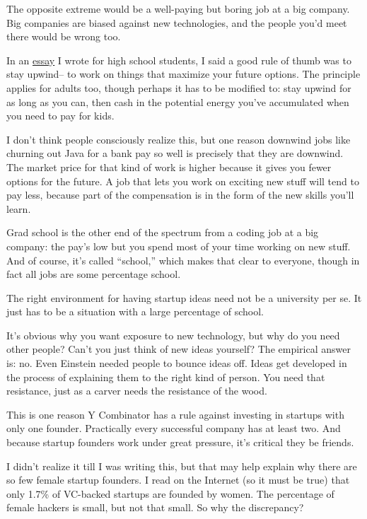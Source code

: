 The opposite extreme would be a well-paying but boring job at a big
company. Big companies are biased against new technologies, and the
people you'd meet there would be wrong too.

In an \href{hs.html}{essay} I wrote for high school students, I said a
good rule of thumb was to stay upwind-- to work on things that maximize
your future options. The principle applies for adults too, though
perhaps it has to be modified to: stay upwind for as long as you can,
then cash in the potential energy you've accumulated when you need to
pay for kids.

I don't think people consciously realize this, but one reason downwind
jobs like churning out Java for a bank pay so well is precisely that
they are downwind. The market price for that kind of work is higher
because it gives you fewer options for the future. A job that lets you
work on exciting new stuff will tend to pay less, because part of the
compensation is in the form of the new skills you'll learn.

Grad school is the other end of the spectrum from a coding job at a big
company: the pay's low but you spend most of your time working on new
stuff. And of course, it's called ``school,'' which makes that clear to
everyone, though in fact all jobs are some percentage school.

The right environment for having startup ideas need not be a university
per se. It just has to be a situation with a large percentage of school.

It's obvious why you want exposure to new technology, but why do you
need other people? Can't you just think of new ideas yourself? The
empirical answer is: no. Even Einstein needed people to bounce ideas
off. Ideas get developed in the process of explaining them to the right
kind of person. You need that resistance, just as a carver needs the
resistance of the wood.

This is one reason Y Combinator has a rule against investing in startups
with only one founder. Practically every successful company has at least
two. And because startup founders work under great pressure, it's
critical they be friends.

I didn't realize it till I was writing this, but that may help explain
why there are so few female startup founders. I read on the Internet (so
it must be true) that only 1.7\% of VC-backed startups are founded by
women. The percentage of female hackers is small, but not that small. So
why the discrepancy?

